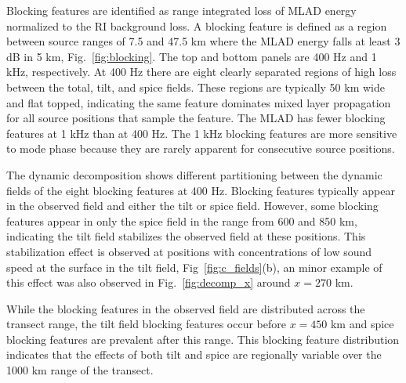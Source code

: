 \documentclass[preprint,NumberedRefs]{JASA}
\begin{document}
Blocking features are identified as range integrated loss of MLAD energy normalized to the RI background loss. A blocking feature is defined as a region between source ranges of 7.5 and 47.5 km where the MLAD energy falls at least 3 dB in 5 km, Fig.~\ref{fig:blocking}. The top and bottom panels are 400 Hz and 1 kHz, respectively. At 400 Hz there are eight clearly separated regions of high loss between the total, tilt, and spice fields. These regions are typically 50 km wide and flat topped, indicating the same feature dominates mixed layer propagation for all source positions that sample the feature. The MLAD has fewer blocking features at 1 kHz than at 400 Hz. The 1 kHz blocking features are more sensitive to mode phase because they are rarely apparent for consecutive source positions.

The dynamic decomposition shows different partitioning between the dynamic fields of the eight blocking features at 400 Hz. Blocking features typically appear in the observed field and either the tilt or spice field. However, some blocking features appear in only the spice field in the range from 600 and 850 km, indicating the tilt field stabilizes the observed field at these positions. This stabilization effect is observed at positions with concentrations of low sound speed at the surface in the tilt field, Fig~\ref{fig:c_fields}(b), an minor example of this effect was also observed in Fig.~\ref{fig:decomp_x} around $x=270$ km.

While the blocking features in the observed field are distributed across the transect range, the tilt field blocking features occur before $x=450$ km and spice blocking features are prevalent after this range. This blocking feature distribution indicates that the effects of both tilt and spice are regionally variable over the 1000 km range of the transect.
\end{document}
